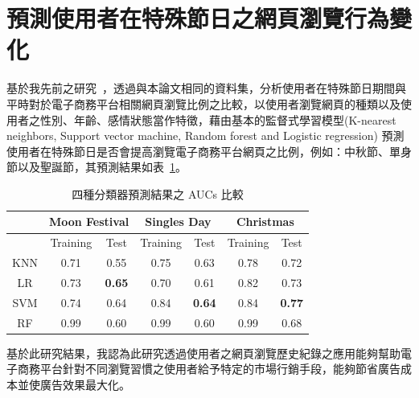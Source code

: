 \section{預測使用者在特殊節日之網頁瀏覽行為變化}
{
基於我先前之研究~\cite{lien2017taai}，透過與本論文相同的資料集，分析使用者在特殊節日期間與平時對於電子商務平台相關網頁瀏覽比例之比較，以使用者瀏覽網頁的種類以及使用者之性別、年齡、感情狀態當作特徵，藉由基本的監督式學習模型(K-nearest neighbors, Support vector machine, Random forest and Logistic regression) 預測使用者在特殊節日是否會提高瀏覽電子商務平台網頁之比例，例如：中秋節、單身節以及聖誕節，其預測結果如表~\ref{tab:classifier-auc}。\par

\begin{table}[tbh]
\centering
\caption{四種分類器預測結果之 AUCs 比較}
\label{tab:classifier-auc}
\begin{tabular}{c|c|c|c|c|c|c}
\hline
    & \multicolumn{2}{c|}{Moon Festival} & \multicolumn{2}{c|}{Singles Day} & \multicolumn{2}{c}{Christmas} \\ \hline\hline
    & Training & Test & Training & Test & Training & Test \\ \hline
KNN & 0.71     & 0.55 & 0.75     & 0.63 & 0.78     & 0.72 \\ \hline
LR  & 0.73     & \textbf{0.65} & 0.70     & 0.61 & 0.82     & 0.73 \\ \hline
SVM & 0.74     & 0.64 & 0.84     & \textbf{0.64} & 0.84     & \textbf{0.77} \\ \hline
RF  & 0.99     & 0.60 & 0.99     & 0.60 & 0.99     & 0.68 \\ \hline
\end{tabular}
\end{table}


基於此研究結果，我認為此研究透過使用者之網頁瀏覽歷史紀錄之應用能夠幫助電子商務平台針對不同瀏覽習慣之使用者給予特定的市場行銷手段，能夠節省廣告成本並使廣告效果最大化。
}
